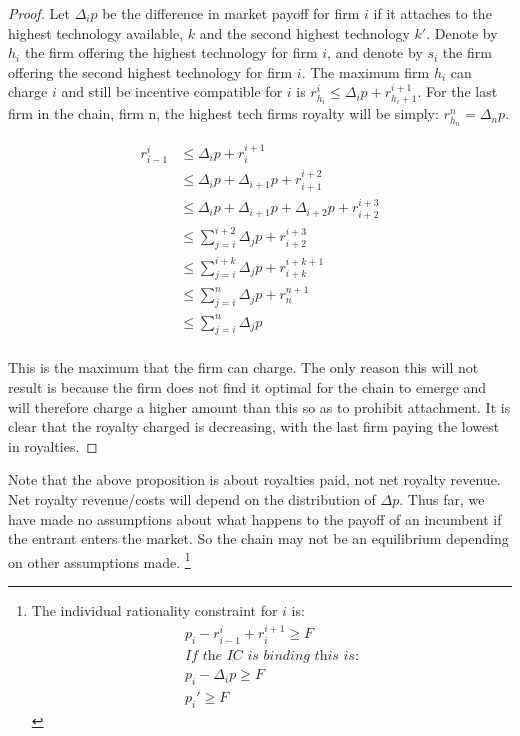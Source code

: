 \documentclass{article}
\begin{document}
\begin{proof}
Let $\Delta_i p$ be the difference in market payoff for firm $i$ if it attaches to the highest technology available, $k$ and the second highest technology $k'$.
Denote by $h_i$ the firm offering the highest technology for firm $i$, and denote by $s_i$ the firm offering the second highest technology for firm $i$. The maximum firm $h_i$ can charge $i$ and still be incentive compatible for $i$ is $r_{h_i}^i \leq \Delta_i p +r_{h_i+1}^{i+1} $. For the last firm in the chain, firm n, the highest tech firms royalty will be simply: $r_{h_n}^n = \Delta_n p $. 

\begin{align*}
r_{i-1}^i & \leq \Delta_i p +r_{i}^{i+1}  \\
 & \leq \Delta_i p + \Delta_{i+1} p + r_{i+1}^{i+2}  \\
 & \leq \Delta_i p + \Delta_{i+1} p +\Delta_{i+2} p + r_{i+2}^{i+3} \\
 & \leq \sum_{j=i}^{i+2} \Delta_j p + r_{i+2}^{i+3}  \\
 &\leq \sum_{j=i}^{i+k} \Delta_j p + r_{i+k}^{i+k+1} \\
 & \leq \sum_{j=i}^{n} \Delta_j p + r_{n}^{n+1}  \\
 & \leq \sum_{j=i}^{n} \Delta_j p  \\
\end{align*}

This is the maximum that the firm can charge. The only reason this will not result is because the firm does not find it optimal for the chain to emerge and will therefore charge a higher amount than this so as to prohibit attachment. It is clear that the royalty charged is decreasing, with the last firm paying the lowest in royalties. 
\end{proof}

Note that the above proposition is about royalties paid, not net royalty revenue. Net royalty revenue/costs will depend on the distribution of $\Delta p$.
Thus far, we have made no assumptions about what happens to the payoff of an incumbent if the entrant enters the market. So the chain may not be an equilibrium depending on other assumptions made.  \footnote{The individual rationality constraint for $i$ is:
\begin{align*}
p_i - r^i_{i-1}+ r^{i+1}_{i} \geq F \\
\textit{If the IC is binding this is:} \\
p_i - \Delta_i p \geq F \\
p_i' \geq F
\end{align*}}
\end{document}
